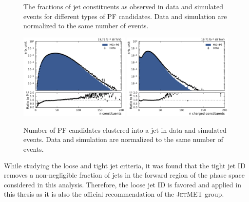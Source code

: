 \begin{figure}[htbp]
    \caption[PF candidate fractions in jets]{The fractions of jet constituents as
            observed in data and simulated events for different types of PF candidates.
            Data and simulation are normalized to the same number of events.}
    \label{fig:jet_constituents_fractions}
\end{figure}

\begin{figure}[htbp]
    \centering
    \includegraphics[width=0.49\textwidth]{figures/measurement/jet_constituent_nConstituents.pdf}\hfill
    \includegraphics[width=0.49\textwidth]{figures/measurement/jet_constituent_nCharged.pdf}
    \caption[Number of particle candidates in jets.]{Number of PF candidates
             clustered into a jet in data and simulated events. Data and simulation are
             normalized to the same number of events.}
    \label{fig:jet_constituents_counts}
\end{figure}

While studying the loose and tight jet criteria, it was found that the tight jet
ID removes a non-negligible fraction of jets in the forward region of the
phase space considered in this analysis. Therefore, the loose jet ID is favored
and applied in this thesis as it is also the official recommendation of the
\textsc{JetMET} group.

